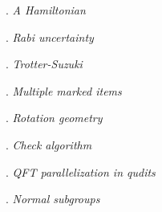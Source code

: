 \vspace{5pt}
\begin{Large}
  . \emph{A Hamiltonian} 
\end{Large}
\vspace{5pt}

\vspace{5pt}
\begin{Large}
  . \emph{Rabi uncertainty} 
\end{Large}
\vspace{5pt}

\vspace{5pt}
\begin{Large}
  . \emph{Trotter-Suzuki} 
\end{Large}
\vspace{5pt}

\vspace{5pt}
\begin{Large}
  . \emph{Multiple marked items} 
\end{Large}
\vspace{5pt}

\vspace{5pt}
\begin{Large}
  . \emph{Rotation geometry}  %
\end{Large}
\vspace{5pt}

\vspace{5pt}
\begin{Large}
  . \emph{Check algorithm} 
\end{Large}
\vspace{5pt}

\vspace{5pt}
\begin{Large}
  . \emph{QFT parallelization in qudits} 
\end{Large}
\vspace{5pt}

\vspace{5pt}
\begin{Large}
  . \emph{Normal subgroups} 
\end{Large}
\vspace{5pt}